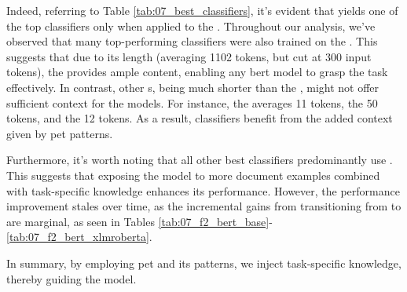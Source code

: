 Indeed, referring to Table \ref{tab:07_best_classifiers}, it's evident that \finetuning{} yields one of the top classifiers only when applied to the \trafilaturaFulltext{}. 
Throughout our analysis, we've observed that many top-performing classifiers were also trained on the \trafilaturaFulltext{}. 
This suggests that due to its length (averaging 1102 tokens, but cut at 300 input tokens), the \trafilaturaFulltext{} provides ample content, enabling any \gls{bert} model to grasp the task effectively.
In contrast, other \contentType{}s, being much shorter than the \trafilaturaFulltext{}, might not offer sufficient context for the models. For instance, the \trafilaturaTitle{} averages 11 tokens, the \trafilaturaAbstract{} 50 tokens, and the \translationTitle{} 12 tokens. 
As a result, classifiers benefit from the added context given by \gls{pet} patterns.

Furthermore, it's worth noting that all other best classifiers predominantly use \petThousand{}. 
This suggests that exposing the model to more document examples combined with task-specific knowledge enhances its performance.
However, the performance improvement stales over time, as the incremental gains from transitioning from \petFiveHundred{} to \petThousand{} are marginal, as seen in Tables \ref{tab:07_f2_bert_base}-\ref{tab:07_f2_bert_xlmroberta}.

In summary, by employing \gls{pet} and its patterns, we inject task-specific knowledge, thereby guiding the model. 


\clearpage